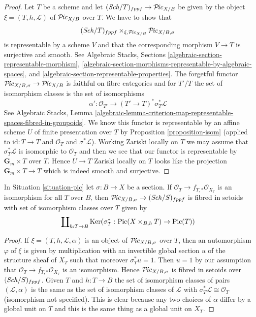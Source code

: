 \begin{proof}
Let $T$ be a scheme and let $(\mathit{Sch}/T)_{fppf} \to \mathcal{P}\!\mathit{ic}_{X/B}$
be given by the object $\xi = (T, h, \mathcal{L})$ of $\mathcal{P}\!\mathit{ic}_{X/B}$
over $T$. We have to show that
$$
(\mathit{Sch}/T)_{fppf} \times_{\xi, \mathcal{P}\!\mathit{ic}_{X/B}} \mathcal{P}\!\mathit{ic}_{X/B, \sigma}
$$
is representable by a scheme $V$ and that the corresponding morphism
$V \to T$ is surjective and smooth. See
Algebraic Stacks, Sections \ref{algebraic-section-representable-morphism},
\ref{algebraic-section-morphisms-representable-by-algebraic-spaces}, and
\ref{algebraic-section-representable-properties}.
The forgetful functor $\mathcal{P}\!\mathit{ic}_{X/B, \sigma} \to \mathcal{P}\!\mathit{ic}_{X/B}$
is faithful on fibre categories and for $T'/T$ the set of isomorphism
classes is the set of isomorphisms
$$
\alpha' : \mathcal{O}_{T'} \longrightarrow (T' \to T)^*\sigma_T^*\mathcal{L}
$$
See Algebraic Stacks, Lemma
\ref{algebraic-lemma-criterion-map-representable-spaces-fibred-in-groupoids}.
We know this functor is representable by an affine scheme $U$ of finite
presentation over $T$ by Proposition \ref{proposition-isom}
(applied to $\text{id} : T \to T$ and $\mathcal{O}_T$ and
$\sigma^*\mathcal{L}$). Working Zariski locally on $T$ we may
assume that $\sigma_T^*\mathcal{L}$ is isomorphic to $\mathcal{O}_T$
and then we see that our functor is representable by
$\mathbf{G}_m \times T$ over $T$. Hence
$U \to T$ Zariski locally on $T$ looks like 
the projection $\mathbf{G}_m \times T \to T$ which
is indeed smooth and surjective.
\end{proof}

\begin{lemma}
\label{lemma-flat-geometrically-connected-fibres-with-section-functor-stack}
In Situation \ref{situation-pic} let $\sigma : B \to X$ be a section.
If $\mathcal{O}_T \to f_{T, *}\mathcal{O}_{X_T}$ is an isomorphism
for all $T$ over $B$, then
$\mathcal{P}\!\mathit{ic}_{X/B, \sigma} \to (\mathit{Sch}/S)_{fppf}$
is fibred in setoids with set of isomorphism classes over $T$ given by
$$
\coprod\nolimits_{h : T \to B}
\mathop{\mathrm{Ker}}(\sigma_T^* : \mathop{\mathrm{Pic}}\nolimits(X \times_{B, h} T) \to \mathop{\mathrm{Pic}}\nolimits(T))
$$
\end{lemma}

\begin{proof}
If $\xi = (T, h, \mathcal{L}, \alpha)$
is an object of $\mathcal{P}\!\mathit{ic}_{X/B, \sigma}$
over $T$, then an automorphism $\varphi$ of
$\xi$ is given by multiplication with an invertible global section $u$
of the structure sheaf of $X_T$ such that moreover $\sigma_T^*u = 1$.
Then $u = 1$ by our assumption that
$\mathcal{O}_T \to f_{T, *}\mathcal{O}_{X_T}$ is an isomorphism.
Hence $\mathcal{P}\!\mathit{ic}_{X/B, \sigma}$
is fibred in setoids over $(\mathit{Sch}/S)_{fppf}$.
Given $T$ and $h : T \to B$
the set of isomorphism classes of pairs $(\mathcal{L}, \alpha)$
is the same as the set of isomorphism classes of $\mathcal{L}$
with $\sigma_T^*\mathcal{L} \cong \mathcal{O}_T$ (isomorphism
not specified). This is clear because any two choices
of $\alpha$ differ by a global unit on $T$ and this is the
same thing as a global unit on $X_T$.
\end{proof}

